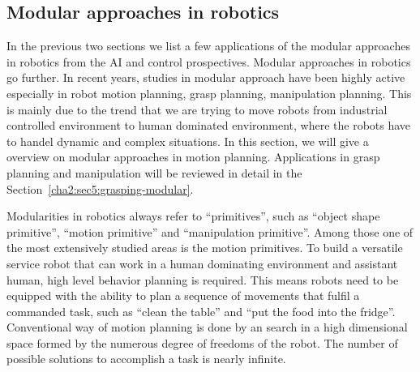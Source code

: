 %
%







\subsection{Modular approaches in robotics}
\label{cha2:sec3:robotics}
In the previous two sections we list a few applications of the modular approaches in robotics from the AI and control prospectives. Modular approaches in robotics go further. In recent years, studies in modular approach have been highly active especially in robot motion planning, grasp planning, manipulation planning. This is mainly due to the trend that we are trying to move robots from industrial controlled environment to human dominated environment, where the robots have to handel dynamic and complex situations. In this section, we will give a overview on modular approaches in motion planning. Applications in grasp planning and manipulation will be reviewed in detail in the Section~\ref{cha2:sec5:grasping-modular}.

Modularities in robotics always refer to ``primitives'', such as ``object shape primitive'', ``motion primitive'' and ``manipulation primitive''. Among those one of the most extensively studied areas is the motion primitives.
To build a versatile service robot that can work in a human dominating environment and assistant human, high level behavior planning is required. This means robots need to be equipped with the ability to plan a sequence of movements that fulfil a commanded task, such as ``clean the table'' and ``put the food into the fridge''. Conventional way of motion planning is done by an search in a high dimensional space formed by the numerous degree of freedoms of the robot. The number of possible solutions to accomplish a task is nearly infinite.

